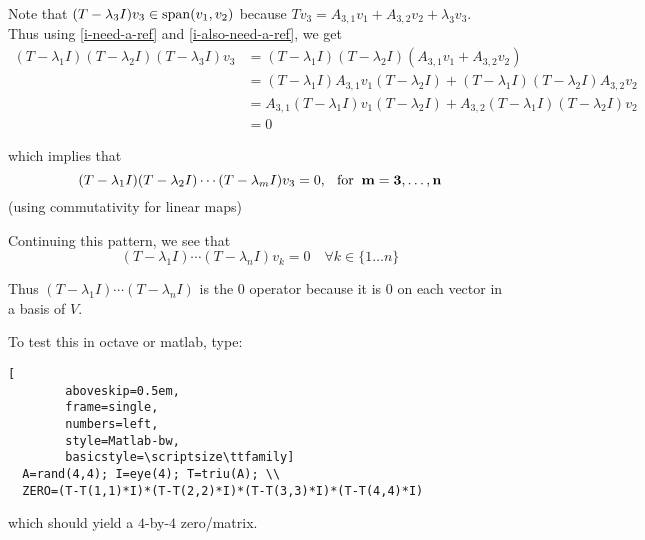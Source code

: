 \begin{prf}
  Note that $(T-\lambda_3 I) v_3 \in \operatorname{span} (v_1, v_2)$ because $T v_3 = A_{3,1} v_1 +   A_{3,2} v_2 + \lambda_3 v_3$. \\
  Thus using \eqref{i-need-a-ref} and \eqref{i-also-need-a-ref}, we get
  \begin{equation}
    \begin{aligned}
      (T- \lambda_1 I) (T- \lambda_2 I) (T- \lambda_3 I)v_3 
      &=(T- \lambda_1 I) (T- \lambda_2 I)(A_{3,1} v_1 +   A_{3,2} v_2)  \\
        &= (T- \lambda_1 I)A_{3,1} v_1(T- \lambda_2 I)+(T- \lambda_1 I)(T- \lambda_2 I)A_{3,2} v_2 \\
        &= A_{3,1}(T- \lambda_1 I) v_1(T- \lambda_2 I)+A_{3,2}(T- \lambda_1 I)(T- \lambda_2 I) v_2 \\
            &= 0
    \end{aligned}
  \end{equation}
  
  which implies that
  \begin{equation}
    (T-\lambda_1 I) (T-\lambda_2 I) \cdots (T-\lambda_m I) v_3= 0, \;\;\, \text{for}\;\; \mathbf{m = 3, \ldots, n}
  \end{equation}
  (using commutativity for linear maps)
  \bigbreak
  
  Continuing this pattern, we see that
  \begin{equation}
    (T-\lambda_1 I) \cdots (T- \lambda_n I) v_k = 0 \quad \forall k \in \{ 1\ldots n \}
  \end{equation}
  
  Thus $(T-\lambda_1 I) \cdots (T- \lambda_n I)$ is the $0$ operator because it is $0$ on each vector in a basis of $V$.
\end{prf}

\begin{example-non}
  To test this  in octave or matlab, type: 
  
  \begin{center}
    \begin{minipage}{\linewidth}
      \addtolength{\linewidth}{-7em} 
      \begin{lstlisting}[
        aboveskip=0.5em,
        frame=single,
        numbers=left,
        style=Matlab-bw,
        basicstyle=\scriptsize\ttfamily]
  A=rand(4,4); I=eye(4); T=triu(A); \\
  ZERO=(T-T(1,1)*I)*(T-T(2,2)*I)*(T-T(3,3)*I)*(T-T(4,4)*I) 
      \end{lstlisting}
      \addtolength{\linewidth}{+7em} 
    \end{minipage}
  \end{center}

  which should yield a $4$-by-$4$ zero\-/matrix. 
\end{example-non}

